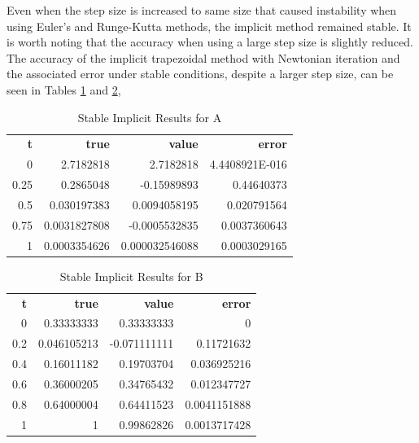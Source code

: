 \documentclass{article}
\begin{document}
Even when the step size is increased to same size that caused instability when using Euler's and Runge-Kutta methods, the implicit method remained stable. It is worth noting that the accuracy when using a large step size is slightly reduced. The accuracy of the implicit trapezoidal method with Newtonian iteration and the associated error under stable conditions, despite a larger step size, can be seen in Tables \ref{tab:un_a_implicit} and \ref{tab:un_b_implicit},

\begin{table}[H]
\footnotesize
\centering
\caption{Stable Implicit Results for A}
\label{tab:un_a_implicit}
\begin{tabular}{rrrr}
\textbf{t} & \textbf{true} & \textbf{value} & \textbf{error} \\
0          & 2.7182818     & 2.7182818      & 4.4408921E-016 \\
0.25       & 0.2865048     & -0.15989893    & 0.44640373     \\
0.5        & 0.030197383   & 0.0094058195   & 0.020791564    \\
0.75       & 0.0031827808  & -0.0005532835  & 0.0037360643   \\
1          & 0.0003354626  & 0.000032546088 & 0.0003029165   
\end{tabular}
\end{table}

\begin{table}[H]
\footnotesize
\centering
\caption{Stable Implicit Results for B}
\label{tab:un_b_implicit}
\begin{tabular}{rrrr}
\textbf{t} & \textbf{true} & \textbf{value} & \textbf{error} \\
0          & 0.33333333    & 0.33333333     & 0              \\
0.2        & 0.046105213   & -0.071111111   & 0.11721632     \\
0.4        & 0.16011182    & 0.19703704     & 0.036925216    \\
0.6        & 0.36000205    & 0.34765432     & 0.012347727    \\
0.8        & 0.64000004    & 0.64411523     & 0.0041151888   \\
1          & 1             & 0.99862826     & 0.0013717428  
\end{tabular}
\end{table}
\end{document}
